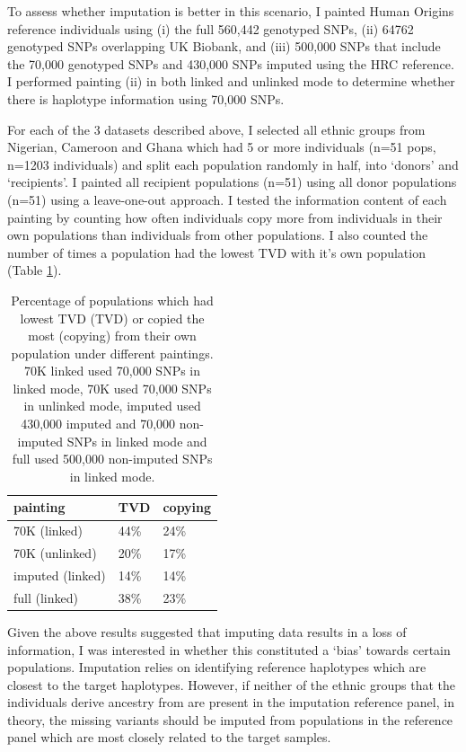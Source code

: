 To assess whether imputation is better in this scenario, I painted Human Origins reference individuals using (i) the full 560,442 genotyped SNPs, (ii) 64762 genotyped SNPs overlapping UK Biobank, and (iii) 500,000 SNPs that include the 70,000 genotyped SNPs and 430,000 SNPs imputed using the HRC reference. I performed painting (ii) in both linked and unlinked mode to determine whether there is haplotype information using 70,000 SNPs.

For each of the 3 datasets described above, I selected all ethnic groups from Nigerian, Cameroon and Ghana which had 5 or more individuals (n=51 pops, n=1203 individuals) and split each population randomly in half, into `donors' and `recipients'. I painted all recipient populations (n=51) using all donor populations (n=51) using a leave-one-out approach. I tested the information content of each painting by counting how often individuals copy more from 
individuals in their own populations than individuals from other populations. I also counted the number of times a population had the lowest TVD with it's own population (Table \ref{table:TVD_copying}).

\begin{table}
\centering
\small
\begin{tabular}{l|l|l}
\hline
painting & TVD & copying\\
\hline
70K (linked) & 44\% & 24\%\\
\hline
70K (unlinked) & 20\% & 17\%\\
\hline
imputed (linked) & 14\% & 14\%\\
\hline
full (linked) & 38\% & 23\%\\
\hline
\end{tabular}
\caption{Percentage of populations which had lowest TVD (TVD) or copied the most (copying) from their own population under different paintings. 70K linked used 70,000 SNPs in linked mode, 70K used 70,000 SNPs in unlinked mode, imputed used 430,000 imputed and 70,000 non-imputed SNPs in linked mode and full used 500,000 non-imputed SNPs in linked mode.}
\label{table:TVD_copying}
\end{table}


Given the above results suggested that imputing data results in a loss of information, I was interested in whether this constituted a `bias' towards certain populations. Imputation relies on identifying reference haplotypes which are closest to the target haplotypes. However, if neither of the ethnic groups that the individuals derive ancestry from are present in the imputation reference panel, in theory, the missing variants should be imputed from populations in the reference panel which are most closely related to the target samples. 

